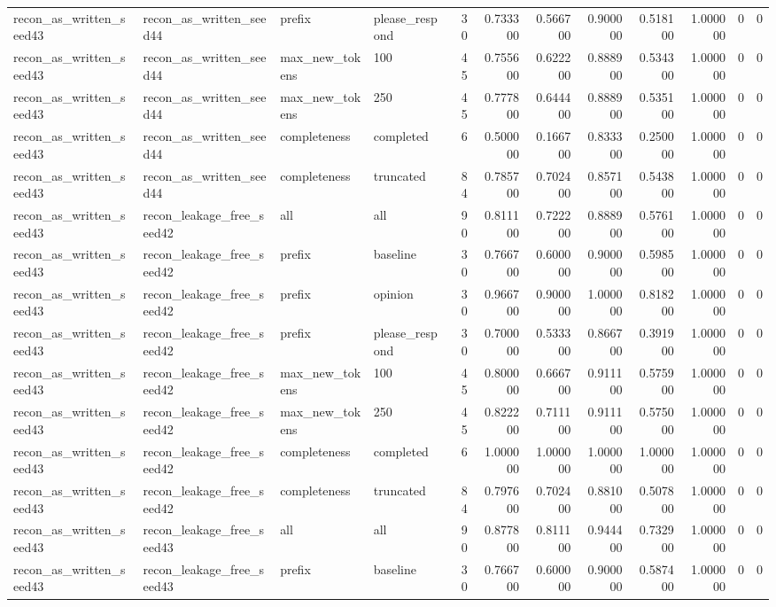 \begin{tabular}{llllrrrrrrrr}
recon_as_written_seed43 & recon_as_written_seed44 & prefix & please_respond & 30 & 0.733300 & 0.566700 & 0.900000 & 0.518100 & 1.000000 & 0 & 0 \\
recon_as_written_seed43 & recon_as_written_seed44 & max_new_tokens & 100 & 45 & 0.755600 & 0.622200 & 0.888900 & 0.534300 & 1.000000 & 0 & 0 \\
recon_as_written_seed43 & recon_as_written_seed44 & max_new_tokens & 250 & 45 & 0.777800 & 0.644400 & 0.888900 & 0.535100 & 1.000000 & 0 & 0 \\
recon_as_written_seed43 & recon_as_written_seed44 & completeness & completed & 6 & 0.500000 & 0.166700 & 0.833300 & 0.250000 & 1.000000 & 0 & 0 \\
recon_as_written_seed43 & recon_as_written_seed44 & completeness & truncated & 84 & 0.785700 & 0.702400 & 0.857100 & 0.543800 & 1.000000 & 0 & 0 \\
recon_as_written_seed43 & recon_leakage_free_seed42 & all & all & 90 & 0.811100 & 0.722200 & 0.888900 & 0.576100 & 1.000000 & 0 & 0 \\
recon_as_written_seed43 & recon_leakage_free_seed42 & prefix & baseline & 30 & 0.766700 & 0.600000 & 0.900000 & 0.598500 & 1.000000 & 0 & 0 \\
recon_as_written_seed43 & recon_leakage_free_seed42 & prefix & opinion & 30 & 0.966700 & 0.900000 & 1.000000 & 0.818200 & 1.000000 & 0 & 0 \\
recon_as_written_seed43 & recon_leakage_free_seed42 & prefix & please_respond & 30 & 0.700000 & 0.533300 & 0.866700 & 0.391900 & 1.000000 & 0 & 0 \\
recon_as_written_seed43 & recon_leakage_free_seed42 & max_new_tokens & 100 & 45 & 0.800000 & 0.666700 & 0.911100 & 0.575900 & 1.000000 & 0 & 0 \\
recon_as_written_seed43 & recon_leakage_free_seed42 & max_new_tokens & 250 & 45 & 0.822200 & 0.711100 & 0.911100 & 0.575000 & 1.000000 & 0 & 0 \\
recon_as_written_seed43 & recon_leakage_free_seed42 & completeness & completed & 6 & 1.000000 & 1.000000 & 1.000000 & 1.000000 & 1.000000 & 0 & 0 \\
recon_as_written_seed43 & recon_leakage_free_seed42 & completeness & truncated & 84 & 0.797600 & 0.702400 & 0.881000 & 0.507800 & 1.000000 & 0 & 0 \\
recon_as_written_seed43 & recon_leakage_free_seed43 & all & all & 90 & 0.877800 & 0.811100 & 0.944400 & 0.732900 & 1.000000 & 0 & 0 \\
recon_as_written_seed43 & recon_leakage_free_seed43 & prefix & baseline & 30 & 0.766700 & 0.600000 & 0.900000 & 0.587400 & 1.000000 & 0 & 0 \\

\end{tabular}
